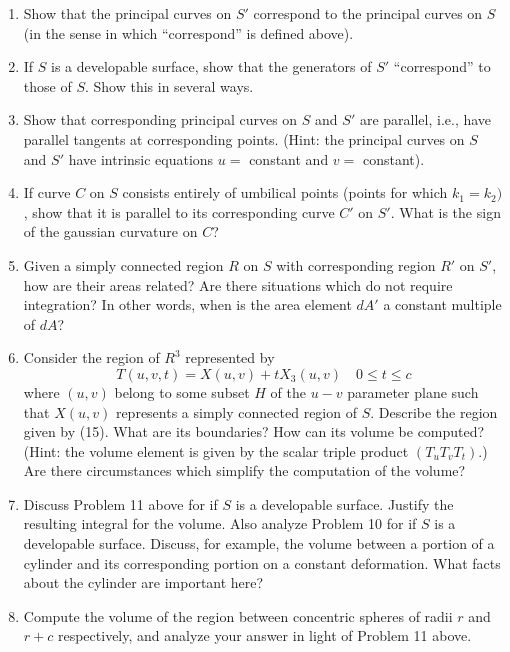 \documentclass{book}
\begin{document}
\begin{enumerate}
  \item[6.] Show that the principal curves on $S'$ correspond to the principal curves on $S$ (in the sense in which ``correspond'' is defined above).
  \item[7.] If $S$ is a developable surface, show that the generators of $S'$ ``correspond'' to those of $S$. Show this in several ways.
  \item[8.] Show that corresponding principal curves on $S$ and $S'$ are parallel, i.e., have parallel tangents at corresponding points. (Hint: the principal curves on $S$ and $S'$ have intrinsic equations $u =$ constant and $v =$ constant).
  \item[9.] If curve $C$ on $S$ consists entirely of umbilical points (points for which $k_{1} = k_{2})$, show that it is parallel to its corresponding curve $C'$ on $S'$. What is the sign of the gaussian curvature on $C$?
  \item[10.] Given a simply connected region $R$ on $S$ with corresponding region $R'$ on $S'$, how are their areas related? Are there situations which do not require integration? In other words, when is the area element $dA'$ a constant multiple of $dA$?
  \item[11.] Consider the region of $R^{3}$ represented by
    \begin{equation}
      T(u,v,t) = X(u,v) + tX_{3}(u,v) \quad  0 \leq  t \leq c
    \end{equation}
    where $(u,v)$ belong to some subset $H$ of the $u-v$ parameter plane such that $X(u,v)$ represents a simply connected region of $S$. Describe the region given by (15). What are its boundaries? How can its volume be computed? (Hint: the volume element is given by the scalar triple product $(T_{u} T_{v} T_{t})$.) Are there circumstances which simplify the computation of the volume?
  \item[12.] Discuss Problem 11 above for if $S$ is a developable surface. Justify the resulting integral for the volume. Also analyze Problem 10 for if $S$ is a developable surface. Discuss, for example, the volume between a portion of a cylinder and its corresponding portion on a constant deformation. What facts about the cylinder are important here?
  \item[13.] Compute the volume of the region between concentric spheres of radii $r$ and $r + c$ respectively, and analyze your answer in light of Problem 11 above.
\end{enumerate}
\end{document}
